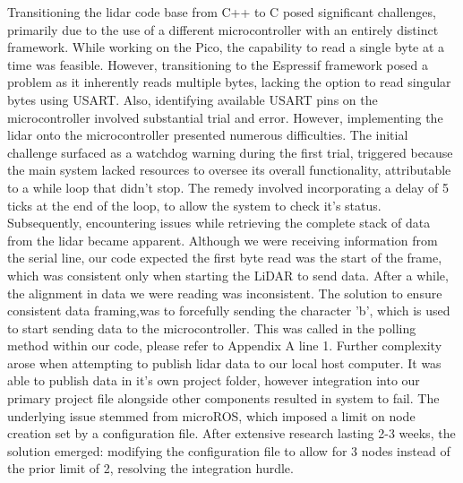\documentclass[conference]{IEEEtran}
\begin{document}
Transitioning the lidar code base from C++ to C posed significant challenges, primarily due to the use of a different microcontroller with an entirely distinct framework. While working on the Pico, the capability to read a single byte at a time was feasible. However, transitioning to the Espressif framework posed a problem as it inherently reads multiple bytes, lacking the option to read singular bytes using USART. Also, identifying available USART pins on the microcontroller involved substantial trial and error.
However, implementing the lidar onto the microcontroller presented numerous difficulties. The initial challenge surfaced as a watchdog warning during the first trial, triggered because the main system lacked resources to oversee its overall functionality, attributable to a while loop that didn't stop. The remedy involved incorporating a delay of 5 ticks at the end of the loop, to allow the system to check it’s status.
Subsequently, encountering issues while retrieving the complete stack of data from the lidar became apparent. Although we were receiving information from the serial line, our code expected the first byte read was the start of the frame, which was consistent only when starting the LiDAR to send data. After a while, the alignment in data we were reading was inconsistent. The solution to ensure consistent data framing,was to forcefully sending the character 'b', which is used to start sending data to the microcontroller. This was called in the polling method within our code, please refer to Appendix A line 1.
Further complexity arose when attempting to publish lidar data to our local host computer. It was able to publish data in it’s own project folder, however integration into our primary project file alongside other components resulted in system to fail. The underlying issue stemmed from microROS, which imposed a limit on node creation set by a configuration file. After extensive research lasting 2-3 weeks, the solution emerged: modifying the configuration file to allow for 3 nodes instead of the prior limit of 2, resolving the integration hurdle.
\end{document}
